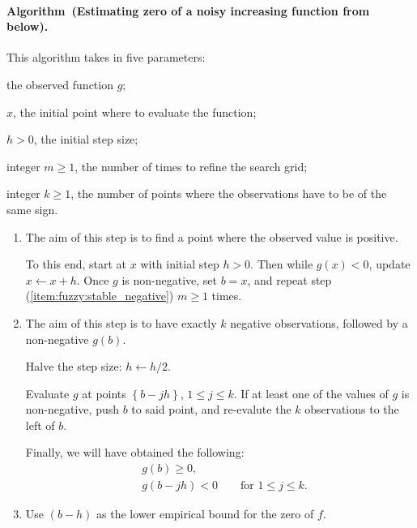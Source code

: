 \documentclass[12pt]{article}
\renewcommand{\geq}{\geqslant}
\renewcommand{\leq}{\leqslant}
\newcommand{\set}[1]{\left\{ #1 \right\}}
\newenvironment{algorithm}[1][]{\paragraph*{Algorithm#1.}}{\vspace{1ex}}
\begin{document}
\begin{algorithm}[~(Estimating zero of a noisy increasing function from below)]
    This algorithm takes in five parameters: \begin{inparaenum}[(i)]
        \item the observed function $g$;
        \item $x$, the initial point where to evaluate the function;
        \item $h > 0$, the initial step size;
        \item integer $m \geq 1$, the number of times to refine the search grid;
        \item integer $k \geq 1$, the number of points where the observations have to be of the same sign.
    \end{inparaenum}
    \begin{enumerate}
        \item \label{item:fuzzy:first_positive}
            The aim of this step is to find a point where the observed value is positive.

            To this end, start at $x$ with initial step $h > 0$.
            Then while $g(x) < 0$, update $x \leftarrow x + h$. Once $g$ is non-negative, set $b = x$, and repeat step (\ref{item:fuzzy:stable_negative}) $m \geq 1$ times.

        \item \label{item:fuzzy:stable_negative}
            The aim of this step is to have exactly $k$ negative observations, followed by a non-negative $g(b)$.

            Halve the step size: $h \leftarrow h / 2$.

            Evaluate $g$ at points $\set{b - j h}$, $1 \leq j \leq k$. If at least one of the values of $g$ is non-negative, push $b$ to said point, and re-evalute the $k$ observations to the left of $b$.

            Finally, we will have obtained the following:
            \begin{align*}
                &g(b) \geq 0, \\
                &g(b - j h) < 0 \qquad \text{for $1 \leq j \leq k$}.
            \end{align*}

        \item Use $(b - h)$ as the lower empirical bound for the zero of $f$.
    \end{enumerate}
\end{algorithm}
\end{document}
